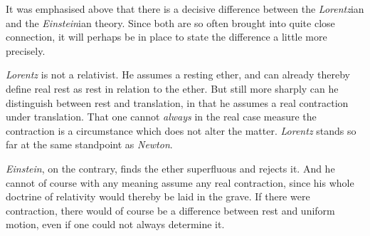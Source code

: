 \documentclass[12pt,a4paper]{article}
\begin{document}
It was emphasised above that there is a decisive difference between the
\emph{Lorentz}ian and the \emph{Einstein}ian theory. Since both are so often
brought into quite close connection, it will perhaps be in place to state the
difference a little more precisely.

\emph{Lorentz} is not a relativist. He assumes a resting ether, and can
already thereby define real rest as rest in relation to the ether. But still
more sharply can he distinguish between rest and translation, in that he
assumes a real contraction under translation. That one cannot \emph{always} in
the real case measure the contraction is a circumstance which does not alter
the matter. \emph{Lorentz} stands so far at the same standpoint as
\emph{Newton}.

\emph{Einstein}, on the contrary, finds the ether superfluous and rejects it.
And he cannot of course with any meaning assume any real contraction, since
his whole doctrine of relativity would thereby be laid in the grave. If there
were contraction, there would of course be a difference between rest and
uniform motion, even if one could not always determine it.
\end{document}
